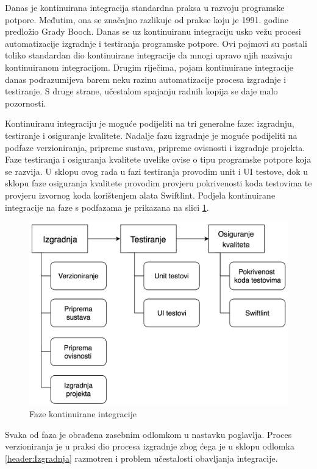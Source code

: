 \documentclass[times, utf8, diplomski, numeric]{fer}
\begin{document}
Danas je kontinuirana integracija standardna praksa u razvoju programske potpore. Međutim, ona se značajno razlikuje od prakse koju je 1991. godine predložio Grady Booch. Danas se uz kontinuiranu integraciju usko vežu procesi automatizacije izgradnje i testiranja programske potpore. Ovi pojmovi su postali toliko standardan dio kontinuirane integracije da mnogi upravo njih nazivaju kontinuiranom integracijom. Drugim riječima, pojam kontinuirane integracije danas podrazumijeva barem neku razinu automatizacije procesa izgradnje i testiranje. S druge strane, učestalom spajanju radnih kopija se daje malo pozornosti.

Kontinuiranu integraciju je moguće podijeliti na tri generalne faze: izgradnju, testiranje i osiguranje kvalitete. Nadalje fazu izgradnje je moguće podijeliti na podfaze verzioniranja, pripreme sustava, pripreme ovisnosti i izgradnje projekta. Faze testiranja i osiguranja kvalitete uvelike ovise o tipu programske potpore koja se razvija. U sklopu ovog rada u fazi testiranja provodim unit i UI testove, dok u sklopu faze osiguranja kvalitete provodim provjeru pokrivenosti koda testovima te provjeru izvornog koda korištenjem alata Swiftlint. Podjela kontinuirane integracije na faze s podfazama je prikazana na slici \ref{fig:CIFazes}.

\begin{figure}
\centering
\includegraphics[scale=0.6]{CIFazes}
\caption{Faze kontinuirane integracije}
\label{fig:CIFazes}
\end{figure}

Svaka od faza je obrađena zasebnim odlomkom u nastavku poglavlja. Proces verzioniranja je u praksi dio procesa izgradnje zbog ćega je u sklopu odlomka \ref{header:Izgradnja} razmotren i problem učestalosti obavljanja integracije.
\end{document}
